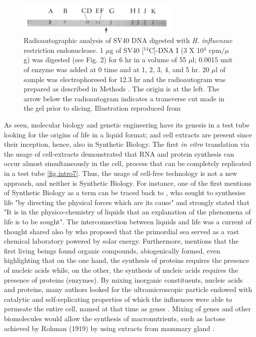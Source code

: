 \begin{figure}[!ht]
  \centering
  \includegraphics[width=0.7\textwidth]{introduction/chapter/figs/electrophoresis.png}
  \caption{Radioautographic analysis of SV40 DNA digested with \textit{H. influenzae} restriction endonuclease. 1 $\mu$g of SV40 [$^{14}$C]-DNA I (3 X 10$^4$ cpm/$\mu$g) was digested (see Fig. 2) for 6 hr in a volume of 55 $\mu$l; 0.0015 unit of enzyme was added at 0 time and at 1, 2, 3, 4, and 5 hr. 20 $\mu$l of sample was electrophoresed for 12.3 hr and the radioautogram was prepared as described in Methods \citep{danna1971specific}. The origin is at the left. The arrow below the radioautogram indicates a transverse cut made in the gel prior to slicing. Illustration reproduced from \citet{danna1971specific}}
  \label{fig.intro4}
\end{figure}

 As seen, molecular biology and genetic engineering have its genesis in a test tube looking for the origins of life in a liquid format; and cell extracts are present since their inception, hence, also in Synthetic Biology. The first \textit{in vitro} translation via the usage of cell-extracts \citep{miller1970visualization} demonstrated that RNA and protein synthesis can occur almost simultaneously in the cell, process that can be completely replicated in a test tube \ref{fig.intro7}. Thus, the usage of cell-free technology is not a new approach, and neither is Synthetic Biology. For instance, one of the first mentions of Synthetic Biology as a term can be traced back to \citet{leduc1912biologie}, who sought to synthesise life "by directing the physical forces which are its cause" and strongly stated that "It is in the physico-chemistry of liquids that an explanation of the phenomena of life is to be sought". 
The interconnection between liquids and life was a current of thought shared also by \citet{haldane1926mathematical} who proposed that the primordial sea served as a vast chemical laboratory powered by solar energy. Furthermore, \citet{oparin1924proiskhozhedenie} mentions that the first living beings found organic compounds, abiogenically formed, even highlighting that on the one hand, the synthesis of proteins requires the presence of nucleic acids while, on the other, the synthesis of nucleic acids requires the presence of proteins (enzymes).  By mixing inorganic constituents, nucleic acids and proteins, many authors looked for the ultramicroscopic particle endowed with catalytic and self-replicating properties of which the influences were able to permeate the entire cell, named at that time as genes \citep{muller1922variation}. Mixing of genes and other biomolecules would allow the synthesis of macronutrients, such as lactose achieved by Rohman (1919) by using extracts from mammary gland \citep{wasteneys1930enzymatic}. 



